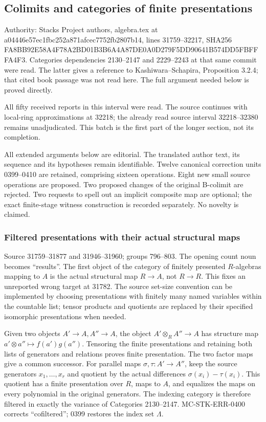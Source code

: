 \subsection{Colimits and categories of finite presentations}\label{colimits-and-categories-of-finite-presentations}

Authority: Stacks Project authors, algebra.tex at a04446e57ec1fbc252a871afcec7752fb2807b14, lines 31759--32217, SHA256 FA8BB92E58A4F78A2BD01B3B6A4A87DE0A0D279F5DD90641B574DD5FBFFFA4F3. Categories dependencies 2130--2147 and 2229--2243 at that same commit were read. The latter gives a reference to Kashiwara--Schapira, Proposition 3.2.4; that cited book passage was not read here. The full argument needed below is proved directly.

All fifty received reports in this interval were read. The source continues with local-ring approximations at 32218; the already read source interval 32218--32380 remains unadjudicated. This batch is the first part of the longer section, not its completion.

All extended arguments below are editorial. The translated author text, its sequence and its hypotheses remain identifiable. Twelve canonical correction units 0399--0410 are retained, comprising sixteen operations. Eight new small source operations are proposed. Two proposed changes of the original B-colimit are rejected. Two requests to spell out an implicit composite map are optional; the exact finite-stage witness construction is recorded separately. No novelty is claimed.

\subsubsection{Filtered presentations with their actual structural maps}\label{filtered-presentations-with-their-actual-structural-maps}

Source 31759--31877 and 31946--31960; groups 796--803. The opening count noun becomes ``results''. The first object of the category of finitely presented \(R\)-algebras mapping to \(A\) is the actual structural map \(R\to A\), not \(R\to R\). This fixes an unreported wrong target at 31782. The source set-size convention can be implemented by choosing presentations with finitely many named variables within the countable list; tensor products and quotients are replaced by their specified isomorphic presentations when needed.

Given two objects \(A'\to A,A''\to A\), the object \(A'\otimes_R A''\to A\) has structure map \(a'\otimes a''\mapsto f(a')g(a'')\). Tensoring the finite presentations and retaining both lists of generators and relations proves finite presentation. The two factor maps give a common successor. For parallel maps \(\sigma,\tau:A'\to A''\), keep the source generators \(x_1,\ldots,x_r\) and quotient by the actual differences \(\sigma(x_i)-\tau(x_i)\). This quotient has a finite presentation over \(R\), maps to \(A\), and equalizes the maps on every polynomial in the original generators. The indexing category is therefore filtered in exactly the variance of Categories 2130--2147. MC-STK-ERR-0400 corrects ``cofiltered''; 0399 restores the index set \(\Lambda\).

